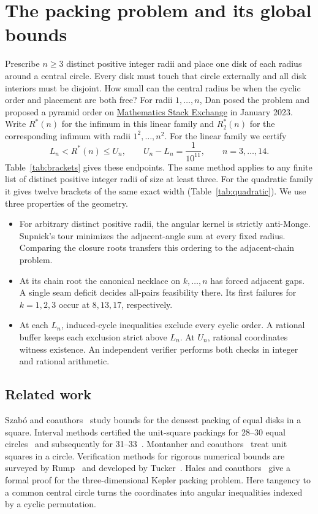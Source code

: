 \documentclass[11pt]{article}
\theoremstyle{definition}
\theoremstyle{remark}
\newcommand{\Rstar}{R^*}
\begin{document}
\section{The packing problem and its global bounds}
Prescribe $n\ge3$ distinct positive integer radii and place one disk of
each radius around a central circle. Every disk must touch that circle
externally and all disk interiors must be disjoint. How small can the
central radius be when the cyclic order and placement are both free?
For radii $1,\ldots,n$, Dan posed the problem and proposed
a pyramid order on \href{https://math.stackexchange.com/q/4619480}{Mathematics Stack Exchange}
in January 2023. Write $\Rstar(n)$ for the infimum in this linear family
and $R_2^*(n)$ for the corresponding infimum with radii $1^2,\ldots,n^2$.
For the linear family we certify
\begin{equation}\label{eq:mainclaim}
 L_n<\Rstar(n)\le U_n,\qquad U_n-L_n=\frac1{10^{11}},
 \qquad n=3,\ldots,14.
\end{equation}
Table~\ref{tab:brackets} gives these endpoints. The same method applies to
any finite list of distinct positive integer radii of size at least three.
For the quadratic family it gives twelve brackets of the same exact width
(Table~\ref{tab:quadratic}). We use three properties of the geometry.
\begin{itemize}
\item For arbitrary distinct positive radii, the angular kernel is strictly
anti-Monge. Supnick's tour minimizes the adjacent-angle sum at every fixed
radius. Comparing the closure roots transfers this ordering to the
adjacent-chain problem.
\item At its chain root the canonical necklace on $k,\ldots,n$ has forced
adjacent gaps. A single seam deficit decides all-pairs feasibility there.
Its first failures for $k=1,2,3$ occur at $8,13,17$, respectively.
\item At each $L_n$, induced-cycle inequalities exclude every cyclic order.
A rational buffer keeps each exclusion strict above $L_n$. At $U_n$,
rational coordinates witness existence. An independent verifier performs
both checks in integer and rational arithmetic.
\end{itemize}

\subsection*{Related work}
Szab\'o and coauthors~\cite{szabo-bounds} study bounds for the densest
packing of equal disks in a square.
Interval methods certified the unit-square packings for 28--30 equal
circles~\cite{markot05} and subsequently for 31--33~\cite{markot21}. Montanher and
coauthors~\cite{markot19} treat unit squares in a circle. Verification
methods for rigorous numerical bounds are surveyed by Rump~\cite{rump}
and developed by Tucker~\cite{tucker}. Hales and
coauthors~\cite{hales} give a formal proof for the three-dimensional
Kepler packing problem. Here tangency to a common central circle turns the
coordinates into angular inequalities indexed by a cyclic permutation.
\end{document}
